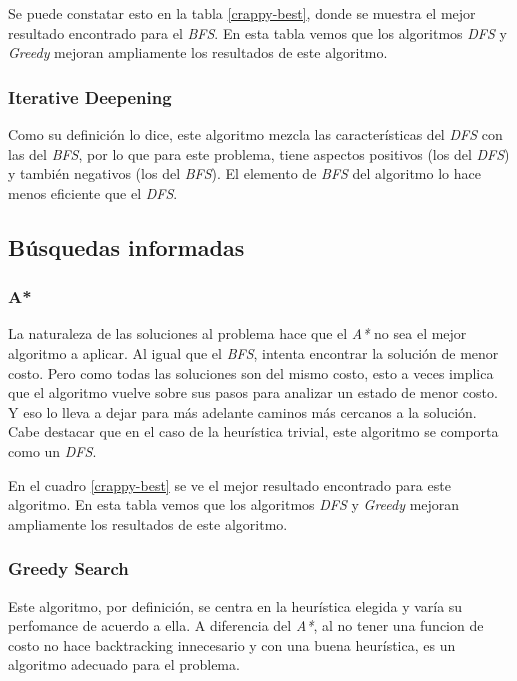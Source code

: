 \documentclass[a4paper,10pt]{article}
\begin{document}
    Se puede constatar esto en la tabla \ref{crappy-best}, donde se muestra el mejor resultado encontrado para el \textit{BFS}.
    En esta tabla vemos que los algoritmos \textit{DFS} y \textit{Greedy} mejoran ampliamente los resultados de este algoritmo.

    \subsubsection{Iterative Deepening}
    Como su definición lo dice, este algoritmo mezcla las características del \textit{DFS} con las del \textit{BFS}, por lo que para este problema, tiene aspectos positivos (los del 
    \textit{DFS}) y también negativos (los del \textit{BFS}). 
    El elemento de \textit{BFS} del algoritmo lo hace menos eficiente que el \textit{DFS}.

\subsection{Búsquedas informadas}
    
    \subsubsection{A*}
    
    La naturaleza de las soluciones al problema hace que el \textit{A*} no sea el mejor algoritmo a aplicar. Al igual que el \textit{BFS}, intenta encontrar la solución de menor costo.
    Pero como todas las soluciones son del mismo costo, esto a veces implica que el algoritmo vuelve sobre sus pasos para analizar un estado de menor costo.
    Y eso lo lleva a dejar para más adelante caminos más cercanos a la solución. \\
    Cabe destacar que en el caso de la heurística trivial, este algoritmo se comporta como un \textit{DFS}.

    En el cuadro \ref{crappy-best} se ve el mejor resultado encontrado para este algoritmo.
    En esta tabla vemos que los algoritmos \textit{DFS} y \textit{Greedy} mejoran ampliamente los resultados de este algoritmo.

    \subsubsection{Greedy Search}
    
    Este algoritmo, por definición, se centra en la heurística elegida y varía su perfomance de acuerdo a ella.
    A diferencia del \textit{A*}, al no tener una funcion de costo no hace backtracking innecesario y con una buena heurística, es un algoritmo adecuado para el problema.
\end{document}
